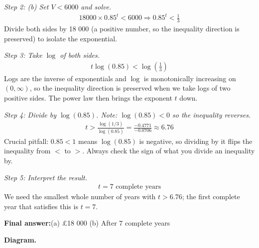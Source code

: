 \documentclass[11pt]{article}
\begin{document}
\textit{Step 2: (b) Set \( V < 6000 \) and solve.}
\[\begin{gathered}
18000 \times 0.85^t < 6000 \Rightarrow 0.85^t < \frac{1}{3}
\end{gathered}\]
Divide both sides by 18 000 (a positive number, so the inequality direction is preserved) to isolate the exponential.

\textit{Step 3: Take \( \log \) of both sides.}
\[\begin{gathered}
t\log(0.85) < \log\!\left(\frac{1}{3}\right)
\end{gathered}\]
Logs are the inverse of exponentials and \( \log \) is monotonically increasing on \( (0, \infty) \), so the inequality direction is preserved when we take logs of two positive sides. The power law then brings the exponent \( t \) down.

\textit{Step 4: Divide by \( \log(0.85) \). Note: \( \log(0.85) < 0 \) so the inequality reverses.}
\[\begin{gathered}
t > \frac{\log(1/3)}{\log(0.85)} = \frac{-0.4771}{-0.0706} \approx 6.76
\end{gathered}\]
Crucial pitfall: \( 0.85 < 1 \) means \( \log(0.85) \) is negative, so dividing by it flips the inequality from \( < \) to \( > \). Always check the sign of what you divide an inequality by.

\textit{Step 5: Interpret the result.}
\[\begin{gathered}
t = 7 \text{ complete years}
\end{gathered}\]
We need the smallest whole number of years with \( t > 6.76 \); the first complete year that satisfies this is \( t = 7 \).

\begin{answerbox}
\textbf{Final answer:}\quad (a) \pounds 18 000 \quad  (b) After \(\displaystyle  7 \) complete years
\end{answerbox}
\textbf{Diagram.}
\end{document}
